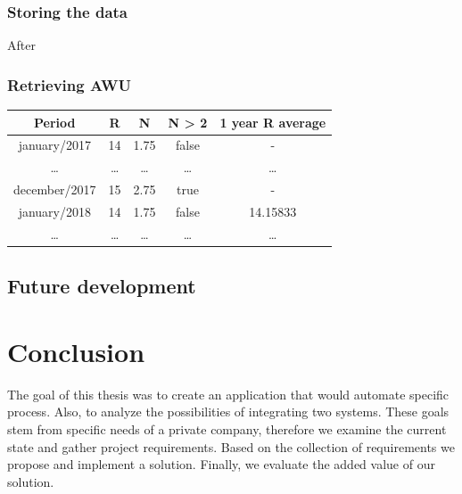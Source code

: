 \documentclass[12pt,oneside]{fithesis2}
\begin{document}
    \subsection{Storing the data}
    After 
    \subsection{Retrieving AWU}
    \begin{center}
    \begin{tabular}{ |c|c|c|c|c| } 
    \hline
    Period & R & N & N > 2 & 1 year R average \\
    \hline
    january/2017 & 14 & 1.75 & false & - \\
    \dots & \dots & \dots & \dots & \dots \\
    december/2017 & 15 & 2.75 & true & - \\
    january/2018 & 14 & 1.75 & false & 14.15833 \\
    \dots & \dots & \dots & \dots & \dots \\
    \hline
    \end{tabular}
    \end{center}
    \section{Future development}
    
    \chapter{Conclusion}
    The goal of this thesis was to create an application that would automate specific process. Also, to analyze the possibilities of integrating two systems. These goals stem from specific needs of a private company, therefore we examine the current state and gather project requirements. Based on the collection of requirements we propose and implement a solution. Finally, we evaluate the added value of our solution.
    
    
    \listoffigures
\end{document}
